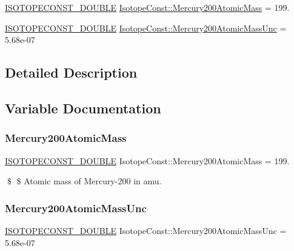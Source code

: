 \begin{DoxyCompactItemize}
\item 
\mbox{\hyperlink{group___isotope_const-_macros_ga8f45a7272ce02c0b4c65c44636ed719a}{I\+S\+O\+T\+O\+P\+E\+C\+O\+N\+S\+T\+\_\+\+D\+O\+U\+B\+LE}} \mbox{\hyperlink{group___isotope_const-_mercury-_hg200_gaa84a8730e2ff5689b0d4648c3e901668}{Isotope\+Const\+::\+Mercury200\+Atomic\+Mass}} = 199.
\item 
\mbox{\hyperlink{group___isotope_const-_macros_ga8f45a7272ce02c0b4c65c44636ed719a}{I\+S\+O\+T\+O\+P\+E\+C\+O\+N\+S\+T\+\_\+\+D\+O\+U\+B\+LE}} \mbox{\hyperlink{group___isotope_const-_mercury-_hg200_gae3fe020aba8d8e0d49192ce72f6aec64}{Isotope\+Const\+::\+Mercury200\+Atomic\+Mass\+Unc}} = 5.\+68e-\/07
\end{DoxyCompactItemize}


\subsection{Detailed Description}


\subsection{Variable Documentation}
\mbox{\label{group___isotope_const-_mercury-_hg200_gaa84a8730e2ff5689b0d4648c3e901668}} 
\subsubsection{\texorpdfstring{Mercury200\+Atomic\+Mass}{Mercury200AtomicMass}}
{\footnotesize\ttfamily \mbox{\hyperlink{group___isotope_const-_macros_ga8f45a7272ce02c0b4c65c44636ed719a}{I\+S\+O\+T\+O\+P\+E\+C\+O\+N\+S\+T\+\_\+\+D\+O\+U\+B\+LE}} Isotope\+Const\+::\+Mercury200\+Atomic\+Mass = 199.}

\$ \$ Atomic mass of Mercury-\/200 in amu. \mbox{\label{group___isotope_const-_mercury-_hg200_gae3fe020aba8d8e0d49192ce72f6aec64}} 
\subsubsection{\texorpdfstring{Mercury200\+Atomic\+Mass\+Unc}{Mercury200AtomicMassUnc}}
{\footnotesize\ttfamily \mbox{\hyperlink{group___isotope_const-_macros_ga8f45a7272ce02c0b4c65c44636ed719a}{I\+S\+O\+T\+O\+P\+E\+C\+O\+N\+S\+T\+\_\+\+D\+O\+U\+B\+LE}} Isotope\+Const\+::\+Mercury200\+Atomic\+Mass\+Unc = 5.\+68e-\/07}

